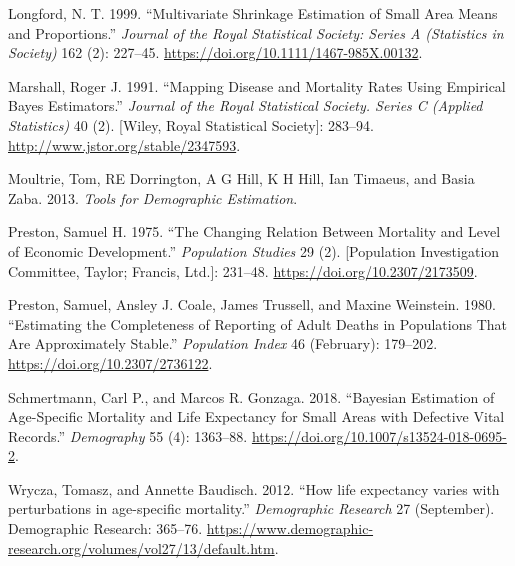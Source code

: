\documentclass[12pt,]{article}
\begin{document}
\leavevmode\hypertarget{ref-Longford1999}{}%
Longford, N. T. 1999. ``Multivariate Shrinkage Estimation of Small Area
Means and Proportions.'' \emph{Journal of the Royal Statistical Society:
Series A (Statistics in Society)} 162 (2): 227--45.
\url{https://doi.org/10.1111/1467-985X.00132}.

\leavevmode\hypertarget{ref-Marshall1991}{}%
Marshall, Roger J. 1991. ``Mapping Disease and Mortality Rates Using
Empirical Bayes Estimators.'' \emph{Journal of the Royal Statistical
Society. Series C (Applied Statistics)} 40 (2). {[}Wiley, Royal
Statistical Society{]}: 283--94.
\url{http://www.jstor.org/stable/2347593}.

\leavevmode\hypertarget{ref-Moultrie}{}%
Moultrie, Tom, RE Dorrington, A G Hill, K H Hill, Ian Timaeus, and Basia
Zaba. 2013. \emph{Tools for Demographic Estimation}.

\leavevmode\hypertarget{ref-Preston_1975}{}%
Preston, Samuel H. 1975. ``The Changing Relation Between Mortality and
Level of Economic Development.'' \emph{Population Studies} 29 (2).
{[}Population Investigation Committee, Taylor; Francis, Ltd.{]}:
231--48. \url{https://doi.org/10.2307/2173509}.

\leavevmode\hypertarget{ref-Preston1980}{}%
Preston, Samuel, Ansley J. Coale, James Trussell, and Maxine Weinstein.
1980. ``Estimating the Completeness of Reporting of Adult Deaths in
Populations That Are Approximately Stable.'' \emph{Population Index} 46
(February): 179--202. \url{https://doi.org/10.2307/2736122}.

\leavevmode\hypertarget{ref-Schmertmann2018}{}%
Schmertmann, Carl P., and Marcos R. Gonzaga. 2018. ``Bayesian Estimation
of Age-Specific Mortality and Life Expectancy for Small Areas with
Defective Vital Records.'' \emph{Demography} 55 (4): 1363--88.
\url{https://doi.org/10.1007/s13524-018-0695-2}.

\leavevmode\hypertarget{ref-Wrycza2012}{}%
Wrycza, Tomasz, and Annette Baudisch. 2012. ``How life expectancy varies
with perturbations in age-specific mortality.'' \emph{Demographic
Research} 27 (September). Demographic Research: 365--76.
\url{https://www.demographic-research.org/volumes/vol27/13/default.htm}.
\end{document}
